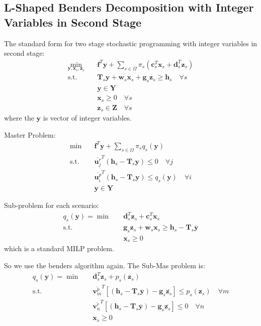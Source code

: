 \documentclass[fleqn,10pt]{wlscirep}
\begin{document}
\subsection{L-Shaped Benders Decomposition with Integer Variables in Second Stage}

The standard form for two stage stochastic programming with integer variables in second stage:
\begin{align}
    \min_{\mathbf{y}, \mathbf{x}_s, \mathbf{z}_s} \quad& \mathbf{f} ^ { T } \mathbf{y} + \sum_{s \in \Omega} \pi_s \left(\mathbf{c}_s^T \mathbf{x}_s + \mathbf{d}_s^T \mathbf{z}_s \right) \\
    \text{s.t.} \quad& \mathbf{T}_s \mathbf{y} + \mathbf{w}_s \mathbf{x}_s + \mathbf{g}_s \mathbf{z}_s \geq \mathbf{h}_s \quad \forall s \\ 
    & \mathbf{y} \in \mathbf{Y} \\ 
    & \mathbf{x}_s \geq 0 \quad \forall s \\
    & \mathbf{z}_s \in \mathbf{Z} \quad \forall s
\end{align}
where the $\mathbf{y}$ is vector of integer variables.

Master Problem:
\begin{align}
    \min \quad& \mathbf{f}^{T} \mathbf{y} + \sum_{s \in \Omega} \pi_s q_s(\mathbf{y}) \\
    \text{s.t.} \quad& \overline{\mathbf{u}_j^r}^T (\mathbf{h}_s - \mathbf{T}_s \mathbf{y}) \leq 0 \quad \forall j \\ 
    & \overline{\mathbf{u}_i^p}^T (\mathbf{h}_s - \mathbf{T}_s \mathbf{y}) \leq q_s(\mathbf{y}) \quad \forall i \\ 
    & \mathbf{y} \in \mathbf{Y}
\end{align}

Sub-problem for each scenario:
\begin{align}
    q_s(\mathbf{y}) = \min \quad & \mathbf{d}^{T}_s \mathbf{z}_s + \mathbf{c}_s^T \mathbf{x}_s \\
    \text{s.t.} \quad & \mathbf{g}_s \mathbf{z}_s + \mathbf{w}_s \mathbf{x}_s \geq \mathbf{h}_s - \mathbf{T}_s \overline{\mathbf{y}} \\
    & \mathbf{x}_s \geq 0
\end{align}
which is a standard MILP problem.

So we use the benders algorithm again. The Sub-Mas problem is:
\begin{align}
    q_s(\mathbf{y}) = \min \quad & \mathbf{d}^{T}_s \mathbf{z}_s + p_s(\mathbf{z}_s) \\
    \text{s.t.} \quad & \overline{\mathbf{v}_m^p}^T \left[\left(\mathbf{h}_s - \mathbf{T}_s \overline{\mathbf{y}} \right) - \mathbf{g}_s \overline{\mathbf{z}_s} \right] \leq p_s(\mathbf{z}_s) \quad \forall m \\ 
    & \overline{\mathbf{v}_n^r}^T \left[\left(\mathbf{h}_s - \mathbf{T}_s \overline{\mathbf{y}} \right) - \mathbf{g}_s \overline{\mathbf{z}_s} \right] \leq 0 \quad \forall n \\ 
    & \mathbf{x}_s \geq 0
\end{align}
\end{document}
